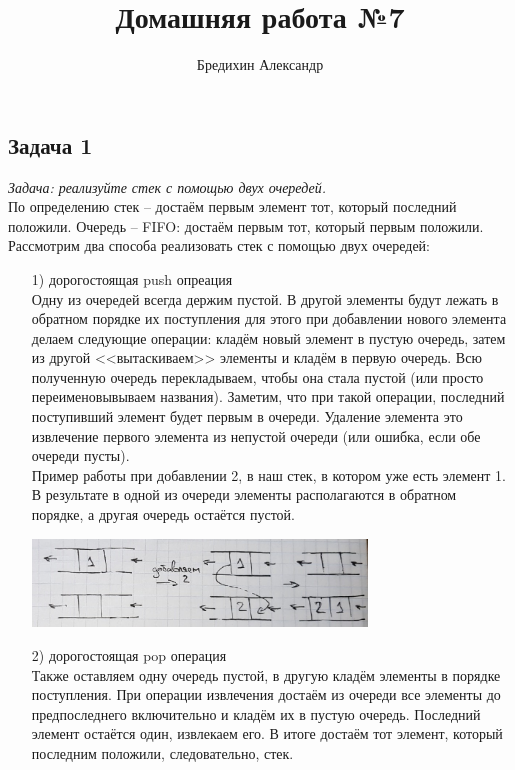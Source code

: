 \documentclass[a4paper,12pt]{article} %
\author{Бредихин Александр}
\title{Домашняя работа №7}
\begin{document}
\maketitle
\subsection*{Задача 1}
\textit{Задача: реализуйте стек с помощью двух очередей.}\\

По определению стек -- достаём первым элемент тот, который последний положили. Очередь -- FIFO: достаём первым тот, который первым положили. Рассмотрим два способа реализовать стек с помощью двух очередей:
\begin{itemize}
\item[1) ] дорогостоящая push опреация\\ 
Одну из очередей всегда держим пустой. В другой элементы будут лежать в обратном порядке их поступления для этого при добавлении нового элемента делаем следующие операции: кладём новый элемент в пустую очередь, затем из другой <<вытаскиваем>> элементы и кладём в первую очередь. Всю полученную очередь перекладываем, чтобы она стала пустой (или просто переименовывываем названия). Заметим, что при такой операции, последний поступивший элемент будет первым в очереди. Удаление элемента это извлечение первого элемента из непустой очереди (или ошибка, если обе очереди пусты).\\
Пример работы при добавлении 2, в наш стек, в котором уже есть элемент 1. В результате в одной из очереди элементы располагаются в обратном порядке, а другая очередь остаётся пустой.
\begin{center}
\includegraphics[width=0.7\textwidth]{ex_1}
\end{center} 

\item[2) ] дорогостоящая pop операция\\
Также оставляем одну очередь пустой, в другую кладём элементы в порядке поступления. При операции извлечения достаём из очереди все элементы до предпоследнего включительно и кладём их в пустую очередь. Последний элемент остаётся один, извлекаем его. В итоге достаём тот элемент, который последним положили, следовательно, стек.
\end{itemize}
\end{document}
